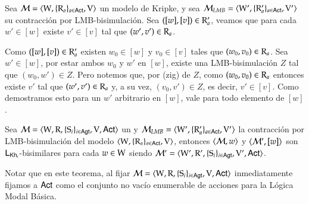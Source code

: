 \begin{demostracion}
    Sea $\mathcal{M} = \langle \mathrm{W},\{\mathrm{R}_a\}_{a\in{\rm \sf Act}},\mathrm{V} \rangle$ un modelo de Kripke, y sea $\mathcal{M}_{LMB} = \langle \mathrm{W}',\{\mathrm{R}_a'\}_{a\in{\rm \sf Act}},\mathrm{V}' \rangle$ su contracción por LMB-bisimulación. Sea $([w],[v]) \in \mathrm{R}'_a$, veamos que para cada $w' \in [w]$ existe $v' \in [v]$ tal que $(w',v') \in \mathrm{R}_a$.

    Como $([w],[v]) \in \mathrm{R}'_a$ existen $w_0 \in [w]$ y $v_0 \in [v]$ tales que $(w_0,v_0)\in \mathrm{R}_a$. Sea $w' \in [w]$, por estar ambos 
    $w_0$ y $w'$ en $[w]$, existe una LMB-bisimulación $Z$ tal que $(w_0,w') \in Z$. Pero notemos que, por (zig) de $Z$, como 
    $(w_0,v_0) \in \mathrm{R}_a$  entonces existe $v'$ tal que $(w',v') \in \mathrm{R}_a$ y, a su vez, 
    $(v_0,v') \in Z$, es decir, $v' \in [v]$. Como demostramos esto para un $w'$ arbitrario en $[w]$, vale para todo elemento de $[w]$.
\end{demostracion}


\begin{teorema}
    Sea $\mathcal{M}=\langle \mathrm{W},\mathrm{R},\{ \mathrm{S}_i \}_{i \in {\rm \sf Agt}},\mathrm{V},{\rm \sf Act} \rangle$ un \ults y $\mathcal{M}_{LMB} = \langle \mathrm{W}',\{\mathrm{R}_a'\}_{a\in{\rm \sf Act}},\mathrm{V}' \rangle$ 
    la contracción por LMB-bisimulación del modelo $\langle \mathrm{W},\{\mathrm{R}_a\}_{a\in{\rm \sf Act}},\mathrm{V} \rangle$, entonces $\langle \mathcal{M},w \rangle$ y $\langle \mathcal{M}',[w] \rangle$ 
    son $\mathsf{L}_{\mathsf{Kh}_i}$-bisimilares para cada $w \in \mathrm{W}$ siendo $\mathcal{M}' = \langle \mathrm{W}',\mathrm{R}',\{ \mathrm{S}_i \}_{i \in {\rm \sf Agt}},\mathrm{V}',{\rm \sf Act} \rangle$.
\end{teorema}

Notar que en este teorema, al fijar $\mathcal{M}=\langle \mathrm{W},\mathrm{R},\{ \mathrm{S}_i \}_{i \in {\rm \sf Agt}},\mathrm{V},{\rm \sf Act} \rangle$ inmediatamente fijamos a ${\rm \sf Act}$ como el conjunto no vacío enumerable de acciones para la Lógica Modal Básica.

